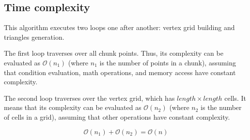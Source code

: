 \subsection{Time complexity}

This algorithm executes two loops one after another: vertex grid building and triangles generation.

The first loop traverses over all chunk points. Thus, its complexity can be evaluated as $\mathcal{O}(n_1)$ (where $n_1$ is the number of points in a chunk), assuming that condition evaluation, math operations, and memory access have constant complexity.

The second loop traverses over the vertex grid, which has $length \times length$ cells. It means that its complexity can be evaluated as $\mathcal{O}(n_2)$ (where $n_2$ is the number of cells in a grid), assuming that other operations have constant complexity.

$$\mathcal{O}(n_1) + \mathcal{O}(n_2) = \mathcal{O}(n)$$
